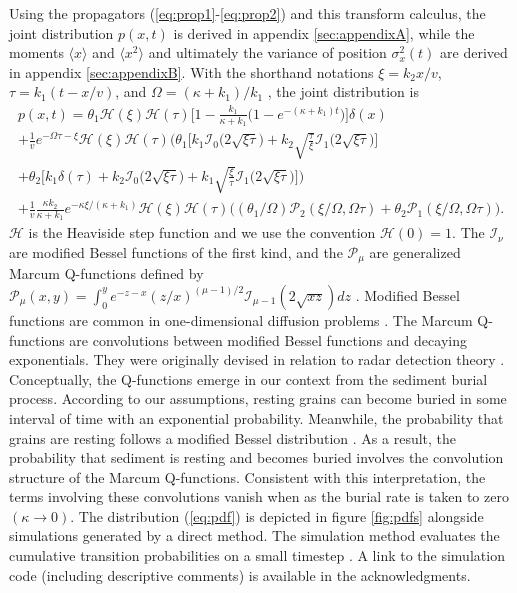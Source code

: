 \documentclass[]{agujournal2018}
\newcommand\bra{\langle}
\newcommand\ket{\rangle}
\begin{document}
Using the propagators (\ref{eq:prop1}-\ref{eq:prop2}) and this transform calculus, the joint distribution $p(x,t)$ is derived in appendix \ref{sec:appendixA}, while the moments $\bra x \ket$ and $\bra x^2 \ket$ and ultimately the variance of position $\sigma_x^2(t)$ are derived in appendix \ref{sec:appendixB}. With the shorthand notations $\xi = k_2 x/v$, $\tau = k_1(t-x/v)$, and $\Omega = (\kappa+k_1)/k_1$ \citep[c.f.][]{Lisle1998}, the joint distribution is 
\begin{multline}
p(x,t) = \theta_1\mathcal{H}(\xi)\mathcal{H}(\tau)\Big[1-\frac{k_1}{\kappa+k_1}\Big(1-e^{-(\kappa+k_1)t}\Big)\Big]\delta(x) \\ + \frac{1}{v}e^{-\Omega \tau - \xi}\mathcal{H}(\xi)\mathcal{H}(\tau)\Big(\theta_1\Big[k_1\mathcal{I}_0\big(2\sqrt{\xi\tau}\big) + k_2\sqrt{\frac{\tau}{\xi}}\mathcal{I}_1\big(2\sqrt{\xi\tau}\big)\Big] \\ + \theta_2\Big[k_1\delta(\tau) + k_2 \mathcal{I}_0\big(2\sqrt{\xi\tau}\big)+k_1 \sqrt{\frac{\xi}{\tau}}\mathcal{I}_1\big(2\sqrt{\xi\tau}\big)\Big]\Big) \\
+ \frac{1}{v}\frac{\kappa k_2}{\kappa + k_1}e^{-\kappa \xi/(\kappa + k_1)}\mathcal{H}(\xi)\mathcal{H}(\tau)\Big((\theta_1/\Omega)\mathcal{P}_2(\xi/\Omega,\Omega\tau) + \theta_2 \mathcal{P}_1(\xi/\Omega,\Omega\tau)\Big).
\label{eq:pdf}
\end{multline}
$\mathcal{H}$ is the Heaviside step function and we use the convention $\mathcal{H}(0)=1$.
The $\mathcal{I}_\nu$ are modified Bessel functions of the first kind, and the $\mathcal{P}_\mu$ are generalized Marcum Q-functions defined by $\mathcal{P}_\mu(x,y) = \int_0^y e^{-z-x}(z/x)^{(\mu-1)/2}\mathcal{I}_{\mu-1}(2\sqrt{xz})dz $ \citep{Temme1996}. Modified Bessel functions are common in one-dimensional diffusion problems \citep[e.g.][]{Einstein1937,Daly2010}. The Marcum Q-functions are convolutions between modified Bessel functions and decaying exponentials. They were originally devised in relation to radar detection theory \citep{Marcum1960}. 
Conceptually, the Q-functions emerge in our context from the sediment burial process. According to our assumptions, resting grains can become buried in some interval of time with an exponential probability. Meanwhile, the probability that grains are resting follows a modified Bessel distribution \citep[e.g.][]{Einstein1937,Lisle1998}.
As a result, the probability that sediment is resting and becomes buried involves the convolution structure of the Marcum Q-functions.
Consistent with this interpretation, the terms involving these convolutions vanish when as the burial rate is taken to zero $(\kappa \rightarrow 0)$.
The distribution (\ref{eq:pdf}) is depicted in figure \ref{fig:pdfs} alongside simulations generated by a direct method. The simulation method evaluates the cumulative transition probabilities on a small timestep \citep[c.f.][]{Barik2006}. A link to the simulation code (including descriptive comments) is available in the acknowledgments.
\end{document}
